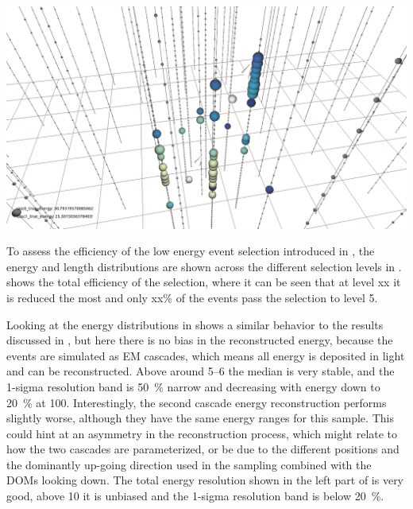 \begin{marginfigure}
    \centering
    \includegraphics[trim=230 45 230 65, clip]{figures/model_independent_simulation/diagonal_e0_30.8_e1_25.3_v0.png}
    \caption[]{}
\end{marginfigure}

To assess the efficiency of the low energy event selection introduced in , the energy and length distributions are shown across the different selection levels in .  shows the total efficiency of the selection, where it can be seen that at level xx it is reduced the most and only xx\% of the events pass the selection to level 5.


Looking at the energy distributions in  shows a similar behavior to the results discussed in , but here there is no bias in the reconstructed energy, because the events are simulated as EM cascades, which means all energy is deposited in light and can be reconstructed. Above around \SIrange{5}{6}{\gev} the median is very stable, and the 1-sigma resolution band is \SI{50}{\percent} narrow and decreasing with energy down to \SI{20}{\percent} at \SI{100}{\gev}. Interestingly, the second cascade energy reconstruction performs slightly worse, although they have the same energy ranges for this sample. This could hint at an asymmetry in the reconstruction process, which might relate to how the two cascades are parameterized, or be due to the different positions and the dominantly up-going direction used in the sampling combined with the DOMs looking down. The total energy resolution shown in the left part of  is very good, above \SI{10}{\gev} it is unbiased and the 1-sigma resolution band is below \SI{20}{\percent}.

